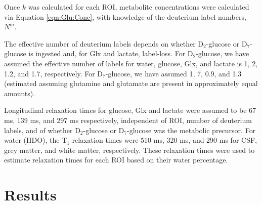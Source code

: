 \documentclass[class=article, crop=false]{standalone}
\begin{document}
Once $k$ was calculated for each ROI, metabolite concentrations were calculated via Equation \ref{eqn:Glu:Conc}, with knowledge of the deuterium label numbers, $N^m$.

The effective number of deuterium labels depends on whether D$_2$-glucose or D$_7$-glucose is ingested and, for Glx and lactate, label-loss. For D$_2$-glucose, we have assumed the effective number of labels for water, glucose, Glx, and lactate is 1, 2, 1.2, and 1.7, respectively\cite{DeGraaf2021CharacterizationStudies}. For D$_7$-glucose, we have assumed 1, 7, 0.9, and 1.3 (estimated\cite{Funk2017TheGlucose} assuming glutamine and glutamate are present in approximately equal amounts). 

Longitudinal relaxation times for glucose, Glx and lactate were assumed to be 67 ms, 139 ms, and 297 ms respectively\cite{DeFeyter2018DeuteriumVivo}, independent of ROI, number of deuterium labels, and of whether D$_2$-glucose or D$_7$-glucose was the metabolic precursor. For water (HDO), the T$_1$ relaxation times were 510 ms, 320 ms, and 290 ms for CSF, grey matter, and white matter, respectively\cite{Cocking2023DeuteriumDosing}. These relaxation times were used to estimate relaxation times for each ROI based on their water percentage.

\section{Results}
\end{document}
